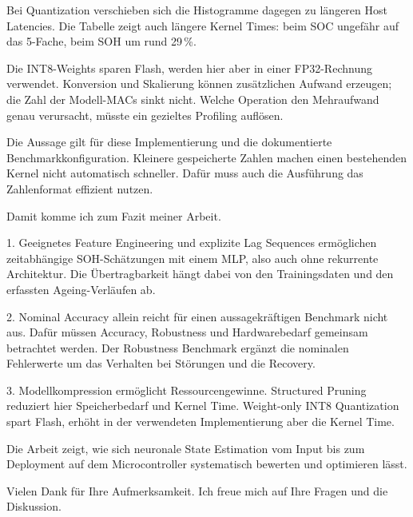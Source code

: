 \begin{sprechtext}

Bei Quantization verschieben sich die Histogramme dagegen zu längeren Host Latencies. Die Tabelle zeigt auch längere Kernel Times: beim SOC ungefähr auf das 5-Fache, beim SOH um rund 29\,\%.

Die INT8-Weights sparen Flash, werden hier aber in einer FP32-Rechnung verwendet. Konversion und Skalierung können zusätzlichen Aufwand erzeugen; die Zahl der Modell-MACs sinkt nicht. Welche Operation den Mehraufwand genau verursacht, müsste ein gezieltes Profiling auflösen.

Die Aussage gilt für diese Implementierung und die dokumentierte Benchmarkkonfiguration. Kleinere gespeicherte Zahlen machen einen bestehenden Kernel nicht automatisch schneller. Dafür muss auch die Ausführung das Zahlenformat effizient nutzen.

\end{sprechtext}


\begin{sprechtext}

Damit komme ich zum Fazit meiner Arbeit.

1. Geeignetes Feature Engineering und explizite Lag Sequences ermöglichen zeitabhängige SOH-Schätzungen mit einem MLP, also auch ohne rekurrente Architektur. Die Übertragbarkeit hängt dabei von den Trainingsdaten und den erfassten Ageing-Verläufen ab.

2. Nominal Accuracy allein reicht für einen aussagekräftigen Benchmark nicht aus. Dafür müssen Accuracy, Robustness und Hardwarebedarf gemeinsam betrachtet werden. Der Robustness Benchmark ergänzt die nominalen Fehlerwerte um das Verhalten bei Störungen und die Recovery.

3. Modellkompression ermöglicht Ressourcengewinne. Structured Pruning reduziert hier Speicherbedarf und Kernel Time. Weight-only INT8 Quantization spart Flash, erhöht in der verwendeten Implementierung aber die Kernel Time.

Die Arbeit zeigt, wie sich neuronale State Estimation vom Input bis zum Deployment auf dem Microcontroller systematisch bewerten und optimieren lässt.

\end{sprechtext}


\begin{sprechtext}

Vielen Dank für Ihre Aufmerksamkeit. Ich freue mich auf Ihre Fragen und die Diskussion.

\end{sprechtext}

